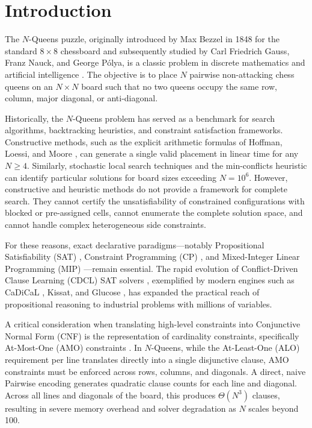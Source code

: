 \documentclass[a4paper,fleqn]{cas-sc}
\begin{document}
\section{Introduction}
\label{sec:intro}

The $N$-Queens puzzle, originally introduced by Max Bezzel in 1848 for the standard $8 \times 8$ chessboard and subsequently studied by Carl Friedrich Gauss, Franz Nauck, and George P{\'o}lya, is a classic problem in discrete mathematics and artificial intelligence \citep{bell2009survey}. The objective is to place $N$ pairwise non-attacking chess queens on an $N \times N$ board such that no two queens occupy the same row, column, major diagonal, or anti-diagonal.

Historically, the $N$-Queens problem has served as a benchmark for search algorithms, backtracking heuristics, and constraint satisfaction frameworks. Constructive methods, such as the explicit arithmetic formulas of Hoffman, Loessi, and Moore \citep{hoffman1969constructions}, can generate a single valid placement in linear time for any $N \ge 4$. Similarly, stochastic local search techniques and the min-conflicts heuristic \citep{sosic1994efficient} can identify particular solutions for board sizes exceeding $N = 10^6$. However, constructive and heuristic methods do not provide a framework for complete search. They cannot certify the unsatisfiability of constrained configurations with blocked or pre-assigned cells, cannot enumerate the complete solution space, and cannot handle complex heterogeneous side constraints.

For these reasons, exact declarative paradigms---notably Propositional Satisfiability (SAT) \citep{biere2021handbook}, Constraint Programming (CP) \citep{regin1994filtering}, and Mixed-Integer Linear Programming (MIP) \citep{gurobi2025}---remain essential. The rapid evolution of Conflict-Driven Clause Learning (CDCL) SAT solvers \citep{fichte2023silent}, exemplified by modern engines such as CaDiCaL \citep{biere2024cadical, fleury2020cadical}, Kissat, and Glucose \citep{audemard2009predicting}, has expanded the practical reach of propositional reasoning to industrial problems with millions of variables.

A critical consideration when translating high-level constraints into Conjunctive Normal Form (CNF) is the representation of cardinality constraints, specifically At-Most-One (AMO) constraints \citep{prestwich2009cnf}. In $N$-Queens, while the At-Least-One (ALO) requirement per line translates directly into a single disjunctive clause, AMO constraints must be enforced across rows, columns, and diagonals. A direct, naive Pairwise encoding generates quadratic clause counts for each line and diagonal. Across all lines and diagonals of the board, this produces $\Theta(N^3)$ clauses, resulting in severe memory overhead and solver degradation as $N$ scales beyond 100.
\end{document}
